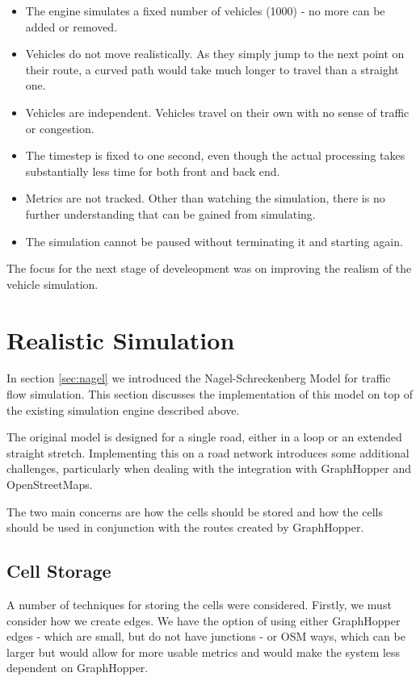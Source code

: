 \documentclass[ %
                    author={Alexander Hill},
                supervisor={Dr. Benjamin Sach},
                    degree={MEng},
                     title={MARMOSET},
                  subtitle={Multi-Agent Route Management using Online Simulation for Efficient Transportation},
                      type={research},
                      year={2016} ]{dissertation}
\begin{document}
\begin{itemize}
    \item The engine simulates a fixed number of vehicles (1000) - no more can
        be added or removed.
    \item Vehicles do not move realistically. As they simply jump to the next
        point on their route, a curved path would take much longer to travel
        than a straight one.
    \item Vehicles are independent. Vehicles travel on their own with no sense
        of traffic or congestion.
    \item The timestep is fixed to one second, even though the actual processing
        takes substantially less time for both front and back end.
    \item Metrics are not tracked. Other than watching the simulation, there is
        no further understanding that can be gained from simulating.
    \item The simulation cannot be paused without terminating it and starting
        again.
\end{itemize}

The focus for the next stage of develeopment was on improving the realism of the
vehicle simulation.

\section{Realistic Simulation}

In section \ref{sec:nagel} we introduced the Nagel-Schreckenberg Model for
traffic flow simulation. This section discusses the implementation of this model
on top of the existing simulation engine described above.

The original model is designed for a single road, either in a loop or an
extended straight stretch. Implementing this on a road network introduces some
additional challenges, particularly when dealing with the integration with
GraphHopper and OpenStreetMaps.

The two main concerns are how the cells should be stored and how the cells
should be used in conjunction with the routes created by GraphHopper.

\subsection{Cell Storage}

A number of techniques for storing the cells were considered. Firstly, we must
consider how we create edges. We have the option of using either GraphHopper
edges - which are small, but do not have junctions - or OSM ways, which can be
larger but would allow for more usable metrics and would make the system less
dependent on GraphHopper.
\end{document}
